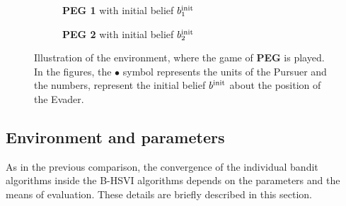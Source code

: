 \documentclass[../main.tex]{subfiles}
\begin{document}
\begin{figure}[ht]
    \centering
    \begin{subfigure}[b]{0.45\textwidth}
        \centering
        \caption{\textbf{PEG 1} with initial belief $b^{\text{init}}_1$}
        \label{exp:osposg:type:fig:1}
    \end{subfigure}
    \hfill
    \begin{subfigure}[b]{0.45\textwidth}
        \centering
        \caption{\textbf{PEG 2} with initial belief $b^{\text{init}}_2$}
        \label{exp:osposg:type:fig:2}
    \end{subfigure}
    \caption[Example \textbf{PEG} instance]{
        Illustration of the environment, where the game of \textbf{PEG}  is played.
        In the figures, the $\bullet$ symbol represents the units of the Pursuer and the numbers, represent the initial belief $b^{\text{init}}$ about the position of the Evader.
    }
    \label{exp:osposg:type:fig}
\end{figure}

\subsection{Environment and parameters}\label{exp:osposg:env}
As in the previous comparison, the convergence of the individual bandit algorithms inside the B-HSVI algorithms depends on the parameters and the means of evaluation.
These details are briefly described in this section.
\end{document}
